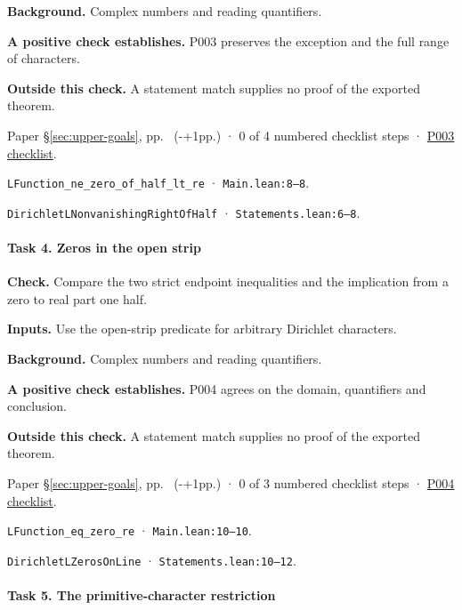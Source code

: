 \textbf{Background.} Complex numbers and reading quantifiers.

\textbf{A positive check establishes.} P003 preserves the exception and the full range of characters.

\textbf{Outside this check.} A statement match supplies no proof of the exported theorem.

Paper \S\ref{sec:upper-goals}, pp.\ \pageref{pn:P003} (\number\numexpr{}-+1\relax pp.) · 0 of 4 numbered checklist steps · \href{https://github.com/GunheeC/rh-lean-verification-atlas/blob/v0.1.0/units/P003.check.md}{P003 checklist}.

\nolinkurl{LFunction_ne_zero_of_half_lt_re} · \nolinkurl{Main.lean:8–8}.

\nolinkurl{DirichletLNonvanishingRightOfHalf} · \nolinkurl{Statements.lean:6–8}.

\paragraph{Task 4. Zeros in the open strip}\label{v7:task-4}

\textbf{Check.} Compare the two strict endpoint inequalities and the implication from a zero to real part one half.

\textbf{Inputs.} Use the open-strip predicate for arbitrary Dirichlet characters.

\textbf{Background.} Complex numbers and reading quantifiers.

\textbf{A positive check establishes.} P004 agrees on the domain, quantifiers and conclusion.

\textbf{Outside this check.} A statement match supplies no proof of the exported theorem.

Paper \S\ref{sec:upper-goals}, pp.\ \pageref{pn:P004} (\number\numexpr{}-+1\relax pp.) · 0 of 3 numbered checklist steps · \href{https://github.com/GunheeC/rh-lean-verification-atlas/blob/v0.1.0/units/P004.check.md}{P004 checklist}.

\nolinkurl{LFunction_eq_zero_re} · \nolinkurl{Main.lean:10–10}.

\nolinkurl{DirichletLZerosOnLine} · \nolinkurl{Statements.lean:10–12}.

\paragraph{Task 5. The primitive-character restriction}\label{v7:task-5}

